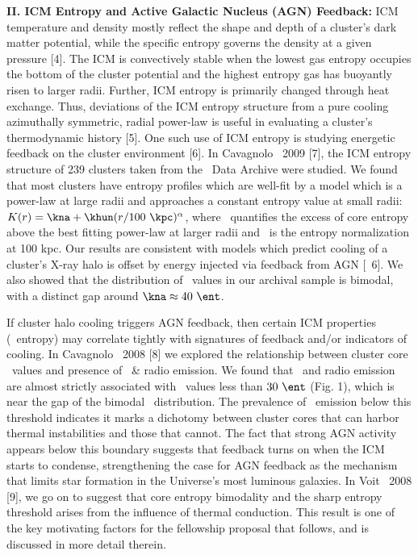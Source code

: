 \documentclass[letterpaper,11pt]{article}
\begin{document}
{\bf{II. ICM Entropy and Active Galactic Nucleus (AGN) Feedback:}} ICM
temperature and density mostly reflect the shape and depth of a
cluster's dark matter potential, while the specific entropy governs
the density at a given pressure [4]. The ICM is convectively stable
when the lowest gas entropy occupies the bottom of the cluster
potential and the highest entropy gas has buoyantly risen to larger
radii. Further, ICM entropy is primarily changed through heat
exchange. Thus, deviations of the ICM entropy structure from a pure
cooling azimuthally symmetric, radial power-law is useful in
evaluating a cluster's thermodynamic history [5]. One such use of ICM
entropy is studying energetic feedback on the cluster environment
[6]. In Cavagnolo \etal\ 2009 [7], the ICM entropy structure of 239
clusters taken from the \chandra\ Data Archive were studied. We found
that most clusters have entropy profiles which are well-fit by a model
which is a power-law at large radii and approaches a constant entropy
value at small radii: $K(r) = \kna + \khun (r/100 ~\kpc)^{\alpha}$,
where \kna\ quantifies the excess of core entropy above the best
fitting power-law at larger radii and \khun\ is the entropy
normalization at 100 kpc. Our results are consistent with models which
predict cooling of a cluster's X-ray halo is offset by energy injected
via feedback from AGN [\eg\ 6]. We also showed that the distribution
of \kna\ values in our archival sample is bimodal, with a distinct gap
around $\kna \approx 40 ~\ent$.

If cluster halo cooling triggers AGN feedback, then certain ICM
properties (\eg\ entropy) may correlate tightly with signatures of
feedback and/or indicators of cooling. In Cavagnolo \etal\ 2008 [8] we
explored the relationship between cluster core \kna\ values and
presence of \halpha\ \& radio emission. We found that \halpha\ and
radio emission are almost strictly associated with \kna\ values less
than $30 ~\ent$ (Fig. 1), which is near the gap of the bimodal
\kna\ distribution. The prevalence of \halpha\ emission below this
threshold indicates it marks a dichotomy between cluster cores that
can harbor thermal instabilities and those that cannot. The fact that
strong AGN activity appears below this boundary suggests that feedback
turns on when the ICM starts to condense, strengthening the case for
AGN feedback as the mechanism that limits star formation in the
Universe's most luminous galaxies. In Voit \etal\ 2008 [9], we go on
to suggest that core entropy bimodality and the sharp entropy
threshold arises from the influence of thermal conduction. This result
is one of the key motivating factors for the fellowship proposal that
follows, and is discussed in more detail therein.
\end{document}
